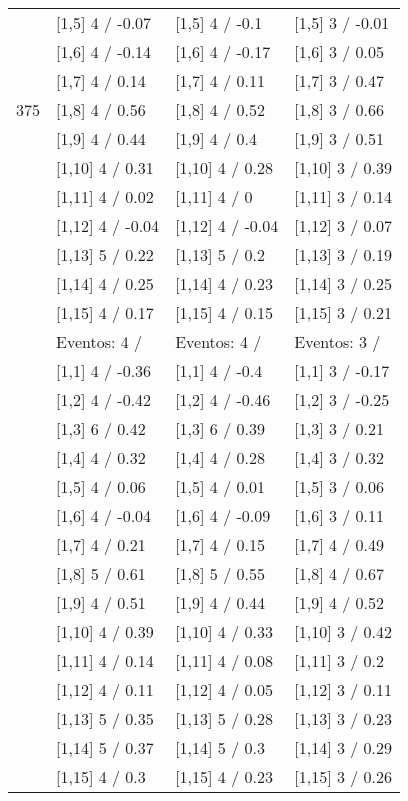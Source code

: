 \begin{table}
\begin{tabular}[t]{llll}
 & {}[1,5] 4  / -0.07 & {}[1,5] 4  / -0.1 & {}[1,5] 3  / -0.01\\
 & {}[1,6] 4  / -0.14 & {}[1,6] 4  / -0.17 & {}[1,6] 3  / 0.05\\
 & {}[1,7] 4  / 0.14 & {}[1,7] 4  / 0.11 & {}[1,7] 3  / 0.47\\
375 & {}[1,8] 4  / 0.56 & {}[1,8] 4  / 0.52 & {}[1,8] 3  / 0.66\\
\addlinespace
 & {}[1,9] 4  / 0.44 & {}[1,9] 4  / 0.4 & {}[1,9] 3  / 0.51\\
 & {}[1,10] 4  / 0.31 & {}[1,10] 4  / 0.28 & {}[1,10] 3  / 0.39\\
 & {}[1,11] 4  / 0.02 & {}[1,11] 4  / 0 & {}[1,11] 3  / 0.14\\
 & {}[1,12] 4  / -0.04 & {}[1,12] 4  / -0.04 & {}[1,12] 3  / 0.07\\
 & {}[1,13] 5  / 0.22 & {}[1,13] 5  / 0.2 & {}[1,13] 3  / 0.19\\
\addlinespace
 & {}[1,14] 4  / 0.25 & {}[1,14] 4  / 0.23 & {}[1,14] 3  / 0.25\\
 & {}[1,15] 4  / 0.17 & {}[1,15] 4  / 0.15 & {}[1,15] 3  / 0.21\\
 & Eventos:  4 / & Eventos:  4 / & Eventos:  3 /\\
 & {}[1,1] 4  / -0.36 & {}[1,1] 4  / -0.4 & {}[1,1] 3  / -0.17\\
 & {}[1,2] 4  / -0.42 & {}[1,2] 4  / -0.46 & {}[1,2] 3  / -0.25\\
\addlinespace
 & {}[1,3] 6  / 0.42 & {}[1,3] 6  / 0.39 & {}[1,3] 3  / 0.21\\
 & {}[1,4] 4  / 0.32 & {}[1,4] 4  / 0.28 & {}[1,4] 3  / 0.32\\
 & {}[1,5] 4  / 0.06 & {}[1,5] 4  / 0.01 & {}[1,5] 3  / 0.06\\
 & {}[1,6] 4  / -0.04 & {}[1,6] 4  / -0.09 & {}[1,6] 3  / 0.11\\
 & {}[1,7] 4  / 0.21 & {}[1,7] 4  / 0.15 & {}[1,7] 4  / 0.49\\
\addlinespace
500 & {}[1,8] 5  / 0.61 & {}[1,8] 5  / 0.55 & {}[1,8] 4  / 0.67\\
 & {}[1,9] 4  / 0.51 & {}[1,9] 4  / 0.44 & {}[1,9] 4  / 0.52\\
 & {}[1,10] 4  / 0.39 & {}[1,10] 4  / 0.33 & {}[1,10] 3  / 0.42\\
 & {}[1,11] 4  / 0.14 & {}[1,11] 4  / 0.08 & {}[1,11] 3  / 0.2\\
 & {}[1,12] 4  / 0.11 & {}[1,12] 4  / 0.05 & {}[1,12] 3  / 0.11\\
\addlinespace
 & {}[1,13] 5  / 0.35 & {}[1,13] 5  / 0.28 & {}[1,13] 3  / 0.23\\
 & {}[1,14] 5  / 0.37 & {}[1,14] 5  / 0.3 & {}[1,14] 3  / 0.29\\
 & {}[1,15] 4  / 0.3 & {}[1,15] 4  / 0.23 & {}[1,15] 3  / 0.26\\
\bottomrule
\end{tabular}
\end{table}
